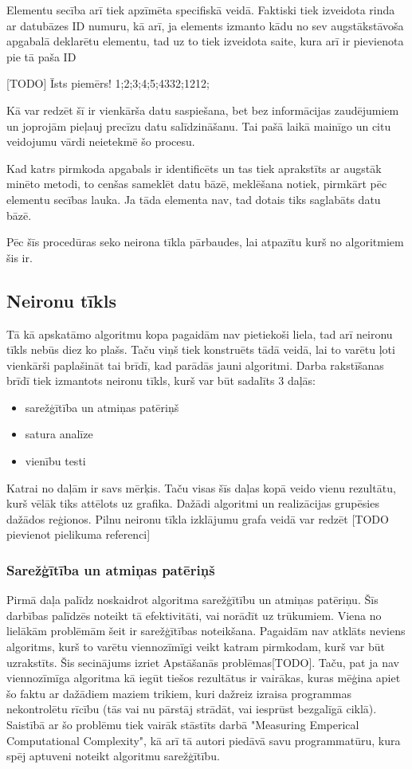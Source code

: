 Elementu secība arī tiek apzīmēta specifiskā veidā. Faktiski tiek izveidota rinda ar datubāzes ID numuru, kā arī, ja elements izmanto kādu no sev augstākstāvoša apgabalā deklarētu elementu, tad uz to tiek izveidota saite, kura arī ir pievienota pie tā paša ID

[TODO] Īsts piemērs! 1;2;3;4;5;43{32;12{12}};

Kā var redzēt šī ir vienkārša datu saspiešana, bet bez informācijas zaudējumiem un joprojām pieļauj precīzu datu salīdzināšanu. Tai pašā laikā mainīgo un citu veidojumu vārdi neietekmē šo procesu.

Kad katrs pirmkoda apgabals ir identificēts un tas tiek aprakstīts ar augstāk minēto metodi, to cenšas sameklēt datu bāzē, meklēšana notiek, pirmkārt pēc elementu secības lauka. Ja tāda elementa nav, tad dotais tiks saglabāts datu bāzē.

Pēc šīs procedūras seko neirona tīkla pārbaudes, lai atpazītu kurš no algoritmiem šis ir.

\subsection{Neironu tīkls}
Tā kā apskatāmo algoritmu kopa pagaidām nav pietiekoši liela, tad arī neironu tīkls nebūs diez ko plašs. Taču viņš tiek konstruēts tādā veidā, lai to varētu ļoti vienkārši paplašināt tai brīdī, kad parādās jauni algoritmi.
Darba rakstīšanas brīdī tiek izmantots neironu tīkls, kurš var būt sadalīts 3 daļās:
\begin{itemize}
\item sarežģītība un atmiņas patēriņš
\item satura analīze
\item vienību testi 
\end{itemize}

Katrai no daļām ir savs mērķis. Taču visas šīs daļas kopā veido vienu rezultātu, kurš vēlāk tiks attēlots uz grafika. Dažādi algoritmi un realizācijas grupēsies dažādos reģionos. Pilnu neironu tīkla izklājumu grafa veidā var redzēt [TODO pievienot pielikuma referenci]

\subsubsection{Sarežģītība un atmiņas patēriņš}
Pirmā daļa palīdz noskaidrot algoritma sarežģītību un atmiņas patēriņu. Šīs darbības palīdzēs noteikt tā efektivitāti, vai norādīt uz trūkumiem. Viena no lielākām problēmām šeit ir sarežģītības noteikšana. Pagaidām nav atklāts neviens algoritms, kurš to varētu viennozīmīgi veikt katram pirmkodam, kurš var būt uzrakstīts. Šis secinājums izriet Apstāšanās problēmas[TODO]. Taču, pat ja nav viennozīmīga algoritma kā iegūt tiešos rezultātus ir vairākas, kuras mēģina apiet šo faktu ar dažādiem maziem trikiem, kuri dažreiz izraisa programmas nekontrolētu rīcību (tās vai nu pārstāj strādāt, vai iesprūst bezgalīgā ciklā). Saistībā ar šo problēmu tiek vairāk stāstīts darbā "Measuring Emperical Computational Complexity", kā arī tā autori piedāvā savu programmatūru, kura spēj aptuveni noteikt algoritmu sarežģītību.

